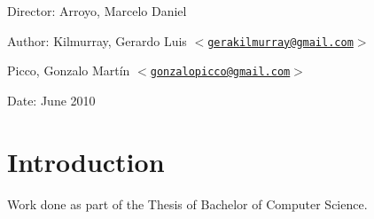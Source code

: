 \begin{Desc}
\item [Director:] Arroyo, Marcelo Daniel
\vspace*{0.8cm}

\item[Author:]Kilmurray, Gerardo Luis $<$\href{mailto:gerakilmurray@gmail.com}{\tt gerakilmurray@gmail.com}$>$ 

Picco, Gonzalo Mart\'in $<$\href{mailto:gonzalopicco@gmail.com}{\tt gonzalopicco@gmail.com}$>$\end{Desc}
\begin{Desc}
\item[Date:]June 2010\end{Desc}
\hypertarget{index_intro}{}\section{Introduction}\label{index_intro}
Work done as part of the Thesis of Bachelor of Computer Science.

